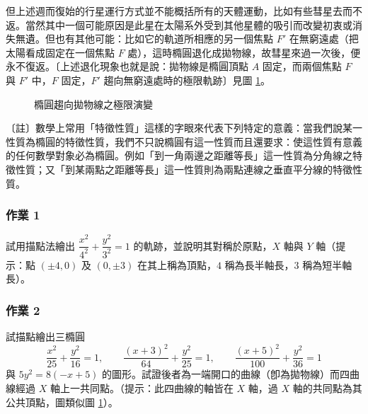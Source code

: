 但上述週而復始的行星運行方式並不能概括所有的天體運動，比如有些彗星去而不返。當然其中一個可能原因是此星在太陽系外受到其他星體的吸引而改變初衷或消失無遺。但也有其他可能：比如它的軌道所相應的另一個焦點 $F'$ 在無窮遠處（把太陽看成固定在一個焦點 $F$ 處），這時橢圓退化成拋物線，故彗星來過一次後，便永不復返。〔上述退化現象也就是說：拋物線是橢圓頂點 $A$ 固定，而兩個焦點 $F$ 與 $F'$ 中，$F$ 固定，$F'$ 趨向無窮遠處時的極限軌跡〕見圖 \ref{fig:b4-2-1-8}。

\begin{figure}[H]
\centering
{}
\caption{橢圓趨向拋物線之極限演變}
\label{fig:b4-2-1-8}
\end{figure}

〔註〕數學上常用「特徵性質」這樣的字眼來代表下列特定的意義：當我們說某一性質為橢圓的特徵性質，我們不只說橢圓有這一性質而且還要求：使這性質有意義的任何數學對象必為橢圓。例如「到一角兩邊之距離等長」這一性質為分角線之特徵性質；又「到某兩點之距離等長」這一性質則為兩點連線之垂直平分線的特徵性質。

\subsubsection*{作業 1}
試用描點法繪出 $\dfrac{x^2}{4^2} + \dfrac{y^2}{3^2} = 1$ 的軌跡，並說明其對稱於原點，$X$ 軸與 $Y$ 軸（提示：點 $(\pm 4, 0)$ 及 $(0, \pm 3)$ 在其上稱為頂點，$4$ 稱為長半軸長，$3$ 稱為短半軸長）。

\subsubsection*{作業 2}
試描點繪出三橢圓
\[ \frac{x^2}{25} + \frac{y^2}{16} = 1, \qquad \frac{(x+3)^2}{64} + \frac{y^2}{25} = 1, \qquad \frac{(x+5)^2}{100} + \frac{y^2}{36} = 1 \]
與 $5y^2 = 8(-x + 5)$ 的圖形。試證後者為一端開口的曲線（卽為拋物線）而四曲線經過 $X$ 軸上一共同點。（提示：此四曲線的軸皆在 $X$ 軸，過 $X$ 軸的共同點為其公共頂點，圖類似圖 \ref{fig:b4-2-1-8}）。

